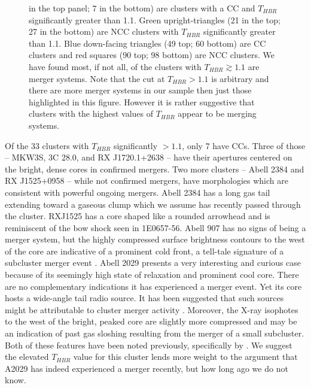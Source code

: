 \begin{figure}
\begin{center}
{  in the top panel; 7 in the bottom) are clusters with a CC and
  $T_{HBR}$ significantly greater than 1.1. Green upright-triangles
  (21 in the top; 27 in the bottom) are NCC clusters with $T_{HBR}$
  significantly greater than 1.1. Blue down-facing triangles (49 top;
  60 bottom) are CC clusters and red squares (90 top; 98 bottom) are
  NCC clusters. We have found most, if not all, of the clusters with
  $T_{HBR} \gtrsim 1.1$ are merger systems. Note that the cut at
  $T_{HBR} > 1.1$ is arbitrary and there are more merger systems in
  our sample then just those highlighted in this figure. However it is
  rather suggestive that clusters with the highest values of $T_{HBR}$
  appear to be merging systems.  }
\label{fig:ftx_tx}
\end{center}
\end{figure}

Of the 33 clusters with $T_{HBR}$ significantly $> 1.1$, only 7 have
CCs. Three of those -- MKW3S, 3C 28.0, and RX J1720.1+2638 -- have
their apertures centered on the bright, dense cores in confirmed
mergers. Two more clusters -- Abell 2384 and RX J1525+0958 -- while
not confirmed mergers, have morphologies which are consistent with
powerful ongoing mergers. Abell 2384 has a long gas tail extending
toward a gaseous clump which we assume has recently passed through the
cluster. RXJ1525 has a core shaped like a rounded arrowhead and is
reminiscent of the bow shock seen in 1E0657-56. Abell 907 has no signs
of being a merger system, but the highly compressed surface brightness
contours to the west of the core are indicative of a prominent cold
front, a tell-tale signature of a subcluster merger event
\citep{2007PhR...443....1M}. Abell 2029 presents a very interesting
and curious case because of its seemingly high state of relaxation and
prominent cool core. There are no complementary indications it has
experienced a merger event. Yet its core hosts a wide-angle tail radio
source. It has been suggested that such sources might be attributable
to cluster merger activity \citep{2000MNRAS.311..649S}. Moreover, the
X-ray isophotes to the west of the bright, peaked core are slightly
more compressed and may be an indication of past gas sloshing
resulting from the merger of a small subcluster. Both of these
features have been noted previously, specifically by
\citet{2004ApJ...616..178C, 2005xrrc.procE7.08C}. We suggest the
elevated $T_{HBR}$ value for this cluster lends more weight to the
argument that A2029 has indeed experienced a merger recently, but how
long ago we do not know.

